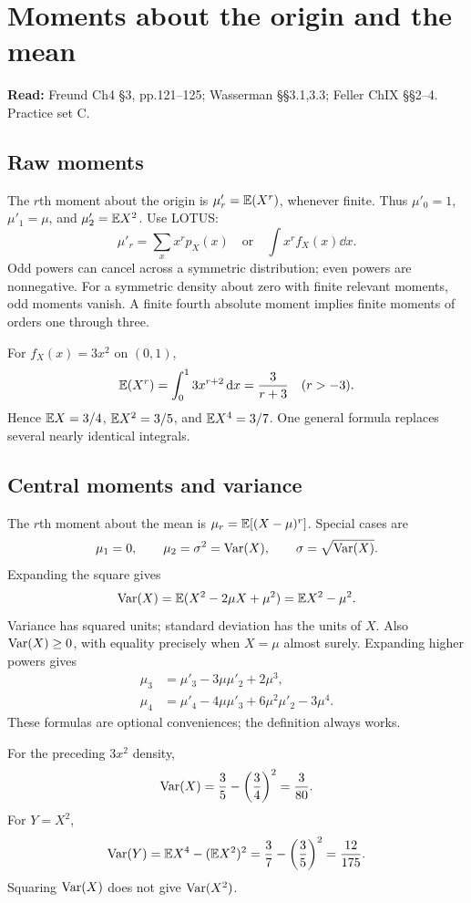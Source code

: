 \section{Moments about the origin and the mean}
\textbf{Read:} Freund Ch4 \S3, pp.121--125; Wasserman \S\S3.1,3.3; Feller ChIX \S\S2--4. Practice set C.
\subsection{Raw moments}
The $r$th moment about the origin is $\mu'_r=\mathbb E(X^r)$, whenever finite. Thus $\mu'_0=1$, $\mu'_1=\mu$, and $\mu'_2=\mathbb E X^2$. Use LOTUS:
\[
\mu'_r=\sum_xx^rp_X(x)\quad\text{or}\quad\int x^rf_X(x)\dd x.
\]
Odd powers can cancel across a symmetric distribution; even powers are nonnegative. For a symmetric density about zero with finite relevant moments, odd moments vanish. A finite fourth absolute moment implies finite moments of orders one through three.
\begin{example}
For $f_X(x)=3x^2$ on $(0,1)$,
\[
\mathbb E(X^r)=\int_0^13x^{r+2}\,\mathrm d x=\frac3{r+3}\quad(r>-3).
\]
Hence $\mathbb E X=3/4$, $\mathbb E X^2=3/5$, and $\mathbb E X^4=3/7$. One general formula replaces several nearly identical integrals.
\end{example}
\subsection{Central moments and variance}
The $r$th moment about the mean is $\mu_r=\mathbb E[(X-\mu)^r]$. Special cases are
\[
\mu_1=0,\qquad\mu_2=\sigma^2=\operatorname{Var}(X),\qquad\sigma=\sqrt{\operatorname{Var}(X)}.
\]
Expanding the square gives
\[
\operatorname{Var}(X)=\mathbb E(X^2-2\mu X+\mu^2)=\mathbb E X^2-\mu^2.
\]
Variance has squared units; standard deviation has the units of $X$. Also $\operatorname{Var}(X)\ge0$, with equality precisely when $X=\mu$ almost surely. Expanding higher powers gives
\begin{align*}
\mu_3&=\mu'_3-3\mu\mu'_2+2\mu^3,\\
\mu_4&=\mu'_4-4\mu\mu'_3+6\mu^2\mu'_2-3\mu^4.
\end{align*}
These formulas are optional conveniences; the definition always works.
\begin{example}
For the preceding $3x^2$ density,
\[
\operatorname{Var}(X)=\frac35-\left(\frac34\right)^2=\frac3{80}.
\]
For $Y=X^2$,
\[
\operatorname{Var}(Y)=\mathbb E X^4-(\mathbb E X^2)^2=\frac37-\left(\frac35\right)^2=\frac{12}{175}.
\]
Squaring $\operatorname{Var}(X)$ does not give $\operatorname{Var}(X^2)$.
\end{example}
